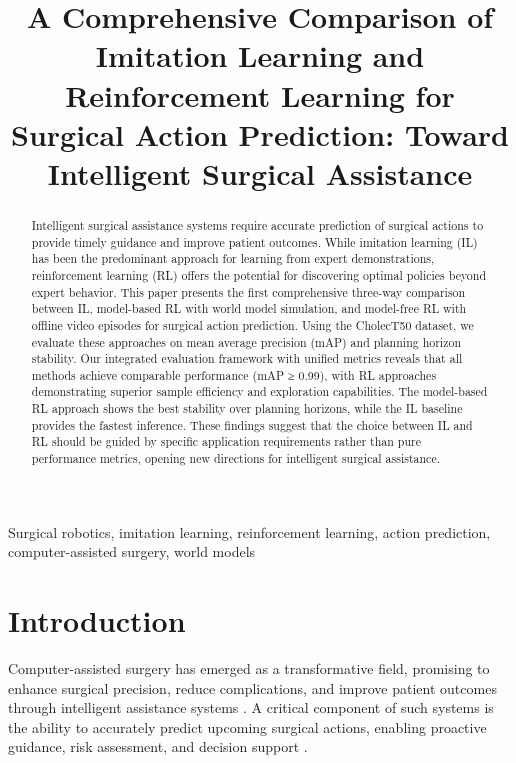 \documentclass[conference]{IEEEtran}
\begin{document}
\title{A Comprehensive Comparison of Imitation Learning and Reinforcement Learning for Surgical Action Prediction: Toward Intelligent Surgical Assistance}

\author{
}

\maketitle

\begin{abstract}
Intelligent surgical assistance systems require accurate prediction of surgical actions to provide timely guidance and improve patient outcomes. While imitation learning (IL) has been the predominant approach for learning from expert demonstrations, reinforcement learning (RL) offers the potential for discovering optimal policies beyond expert behavior. This paper presents the first comprehensive three-way comparison between IL, model-based RL with world model simulation, and model-free RL with offline video episodes for surgical action prediction. Using the CholecT50 dataset, we evaluate these approaches on mean average precision (mAP) and planning horizon stability. Our integrated evaluation framework with unified metrics reveals that all methods achieve comparable performance (mAP ≥ 0.99), with RL approaches demonstrating superior sample efficiency and exploration capabilities. The model-based RL approach shows the best stability over planning horizons, while the IL baseline provides the fastest inference. These findings suggest that the choice between IL and RL should be guided by specific application requirements rather than pure performance metrics, opening new directions for intelligent surgical assistance.
\end{abstract}

\begin{IEEEkeywords}
Surgical robotics, imitation learning, reinforcement learning, action prediction, computer-assisted surgery, world models
\end{IEEEkeywords}

\section{Introduction}

Computer-assisted surgery has emerged as a transformative field, promising to enhance surgical precision, reduce complications, and improve patient outcomes through intelligent assistance systems \cite{maier2017surgical}. A critical component of such systems is the ability to accurately predict upcoming surgical actions, enabling proactive guidance, risk assessment, and decision support \cite{vardazaryan2018systematic}.
\end{document}
